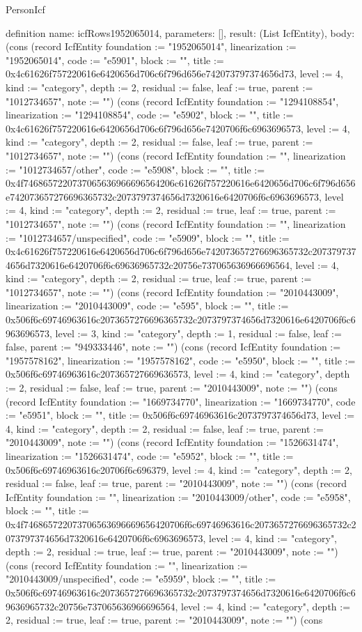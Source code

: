 \begin{lexlean}{PersonIcf}
\begin{semanticmodule}
definition{
  name: icfRows1952065014,
  parameters: [],
  result: (List IcfEntity),
  body: (cons (record IcfEntity {foundation := "1952065014", linearization := "1952065014", code := "e5901", block := "", title := 0x4c61626f757220616e6420656d706c6f796d656e742073797374656d73, level := 4, kind := "category", depth := 2, residual := false, leaf := true, parent := "1012734657", note := ""}) (cons (record IcfEntity {foundation := "1294108854", linearization := "1294108854", code := "e5902", block := "", title := 0x4c61626f757220616e6420656d706c6f796d656e7420706f6c6963696573, level := 4, kind := "category", depth := 2, residual := false, leaf := true, parent := "1012734657", note := ""}) (cons (record IcfEntity {foundation := "", linearization := "1012734657/other", code := "e5908", block := "", title := 0x4f7468657220737065636966696564206c61626f757220616e6420656d706c6f796d656e742073657276696365732c2073797374656d7320616e6420706f6c6963696573, level := 4, kind := "category", depth := 2, residual := true, leaf := true, parent := "1012734657", note := ""}) (cons (record IcfEntity {foundation := "", linearization := "1012734657/unspecified", code := "e5909", block := "", title := 0x4c61626f757220616e6420656d706c6f796d656e742073657276696365732c2073797374656d7320616e6420706f6c69636965732c20756e737065636966696564, level := 4, kind := "category", depth := 2, residual := true, leaf := true, parent := "1012734657", note := ""}) (cons (record IcfEntity {foundation := "2010443009", linearization := "2010443009", code := "e595", block := "", title := 0x506f6c69746963616c2073657276696365732c2073797374656d7320616e6420706f6c6963696573, level := 3, kind := "category", depth := 1, residual := false, leaf := false, parent := "949333446", note := ""}) (cons (record IcfEntity {foundation := "1957578162", linearization := "1957578162", code := "e5950", block := "", title := 0x506f6c69746963616c207365727669636573, level := 4, kind := "category", depth := 2, residual := false, leaf := true, parent := "2010443009", note := ""}) (cons (record IcfEntity {foundation := "1669734770", linearization := "1669734770", code := "e5951", block := "", title := 0x506f6c69746963616c2073797374656d73, level := 4, kind := "category", depth := 2, residual := false, leaf := true, parent := "2010443009", note := ""}) (cons (record IcfEntity {foundation := "1526631474", linearization := "1526631474", code := "e5952", block := "", title := 0x506f6c69746963616c20706f6c696379, level := 4, kind := "category", depth := 2, residual := false, leaf := true, parent := "2010443009", note := ""}) (cons (record IcfEntity {foundation := "", linearization := "2010443009/other", code := "e5958", block := "", title := 0x4f746865722073706563696669656420706f6c69746963616c2073657276696365732c2073797374656d7320616e6420706f6c6963696573, level := 4, kind := "category", depth := 2, residual := true, leaf := true, parent := "2010443009", note := ""}) (cons (record IcfEntity {foundation := "", linearization := "2010443009/unspecified", code := "e5959", block := "", title := 0x506f6c69746963616c2073657276696365732c2073797374656d7320616e6420706f6c69636965732c20756e737065636966696564, level := 4, kind := "category", depth := 2, residual := true, leaf := true, parent := "2010443009", note := ""}) (cons }
\end{semanticmodule}
\end{lexlean}
